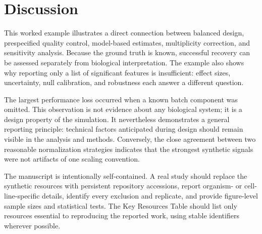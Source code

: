 \section{Discussion}
This worked example illustrates a direct connection between balanced design,
prespecified quality control, model-based estimates, multiplicity correction,
and sensitivity analysis. Because the ground truth is known, successful recovery
can be assessed separately from biological interpretation. The example also
shows why reporting only a list of significant features is insufficient: effect
sizes, uncertainty, null calibration, and robustness each answer a different
question.

The largest performance loss occurred when a known batch component was omitted.
This observation is not evidence about any biological system; it is a design
property of the simulation. It nevertheless demonstrates a general reporting
principle: technical factors anticipated during design should remain visible in
the analysis and methods. Conversely, the close agreement between two reasonable
normalization strategies indicates that the strongest synthetic signals were
not artifacts of one scaling convention.

The manuscript is intentionally self-contained. A real study should replace the
synthetic resources with persistent repository accessions, report organism- or
cell-line-specific details, identify every exclusion and replicate, and provide
figure-level sample sizes and statistical tests. The Key Resources Table should
list only resources essential to reproducing the reported work, using stable
identifiers wherever possible.
